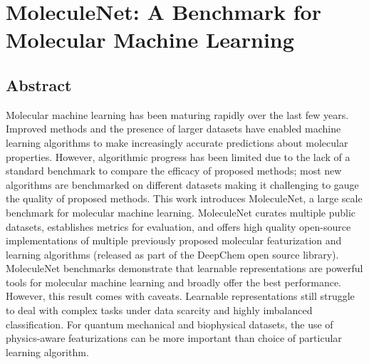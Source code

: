 \section{MoleculeNet: A Benchmark for Molecular Machine Learning}

\subsection{Abstract}
Molecular machine learning has been maturing rapidly over the last few years. Improved methods and the presence of larger datasets have enabled machine learning algorithms to make increasingly accurate predictions about molecular properties. However, algorithmic progress has been limited due to the lack of a standard benchmark to compare the efficacy of proposed methods; most new algorithms are benchmarked on different datasets making it challenging to gauge the quality of proposed methods. This work introduces MoleculeNet, a large scale benchmark for molecular machine learning. MoleculeNet curates multiple public datasets, establishes metrics for evaluation, and offers high quality open-source implementations of multiple previously proposed molecular featurization and learning algorithms (released as part of the DeepChem open source library). MoleculeNet benchmarks demonstrate that learnable representations are powerful tools for molecular machine learning and broadly offer the best performance. However, this result comes with caveats. Learnable representations still struggle to deal with complex tasks under data scarcity and highly imbalanced classification. For quantum mechanical and biophysical datasets, the use of physics-aware featurizations can be more important than choice of particular learning algorithm. \\%






